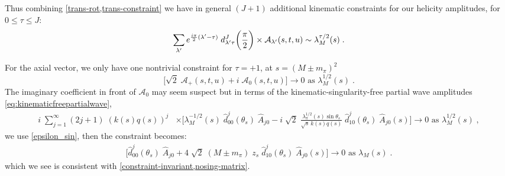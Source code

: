 Thus combining \cref{trans-rot,trans-constraint} we have in general \((J + 1)\) additional kinematic constraints for our helicity amplitudes, for \(0 \leq \tau \leq J\):
  \begin{equation}
    \sum_{{\lambda^\prime}} e^{\frac{i\pi}{2} ({\lambda^\prime} - \tau)} \; d^J_{{\lambda^\prime} \tau}\bigg(\frac{\pi}{2} \bigg) \times \mathcal{A}_{\lambda^\prime}(s,t,u) \sim \lambda^{\tau/2}_M(s)   \; .
  \end{equation}

For the axial vector, we only have one nontrivial constraint for \(\tau = +1\), at \(s = (M \pm  m_\pi)^2\)
  \begin{equation}
      \bigg[ \sqrt{2} \; \mathcal{A}_+(s,t,u) + i \; \mathcal{A}_0(s,t,u) \bigg] \to 0 \text{ as } \lambda^{1/2}_M(s) \; .
  \end{equation}
%
The imaginary coefficient in front of \(\mathcal{A}_0\) may seem suspect but in terms of the kinematic-singularity-free partial wave amplitudes \cref{eq:kinematicfreepartialwave},
  \begin{align}
          i \;  \sum_{j=1}^\infty (2j+1) \; (k(s)q(s))^{j} &\times
          \bigg[\lambda_M^{-1/2}(s) \; \hat{d}_{00}^j(\theta_s) \; \hat{A}_{j0}
           - i \; \sqrt{2} \; \frac{\lambda^{1/2}_\pi(s) \sin \theta_s}{\sqrt{s} \, k(s)q(s)} \; \hat{d}_{10}^j(\theta_s) \; \hat{A}_{j0}(s) \bigg]
           \to 0 \text{ as } \lambda^{1/2}_M(s) \; ,
  \end{align}
we use \cref{epsilon_sin}, then the constraint becomes:
  \begin{align}
          \bigg[\hat{d}_{00}^j(\theta_s) \; \hat{A}_{j0}
           + 4 \; \sqrt{2} \; (M \pm m_\pi) \; z_s \; \hat{d}_{10}^j(\theta_s) \; \hat{A}_{j0}(s) \bigg]
           \to 0 \text{ as } \lambda_M(s) \; .
  \end{align}
which we see is consistent with \cref{constraint-invariant,nosing-matrix}.
